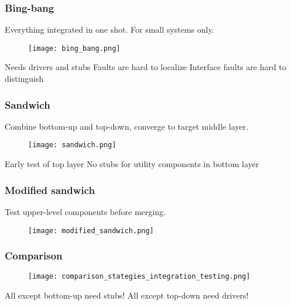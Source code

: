 \subsubsection{Bing-bang}
Everything integrated in one shot.
For small systems only.

\begin{figure}[!ht]
    \centering
    \texttt{[image: bing\_bang.png]}
\end{figure}

\begin{itemize}
        \consitem{} Needs drivers and stubs
        \consitem{} Faults are hard to localize
        \consitem{} Interface faults are hard to distinguish
\end{itemize}

\subsubsection{Sandwich}
Combine bottom-up and top-down, converge to target middle layer.

\begin{figure}[!ht]
    \centering
    \texttt{[image: sandwich.png]}
\end{figure}

\begin{itemize}
        \proitem{} Early test of top layer
        \consitem{} No stubs for utility components in bottom layer
\end{itemize}

\subsubsection{Modified sandwich}
Test upper-level components before merging.

\begin{figure}[!ht]
    \centering
    \texttt{[image: modified\_sandwich.png]}
\end{figure}

\subsubsection{Comparison}

\begin{figure}[!ht]
    \centering
    \texttt{[image: comparison\_stategies\_integration\_testing.png]}
\end{figure}

All except bottom-up need stubs!
All except top-down need drivers!
\FloatBarrier

